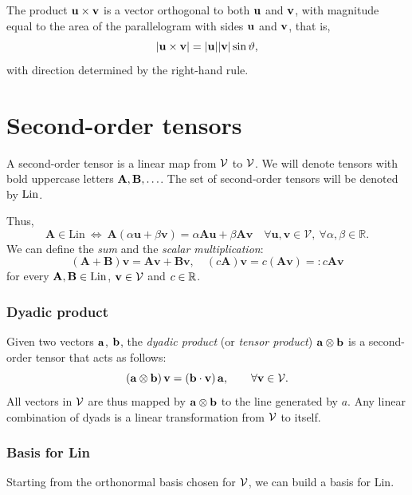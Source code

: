 The product $\mathbf{u}\times \mathbf{v}$ is a vector orthogonal to both $\mathbf{u}$ and $\mathbf{v}$, with magnitude equal to the area of the parallelogram with sides $\mathbf{u}$ and $\mathbf{v}$, that is,
\begin{equation}
	|\mathbf{u} \times \mathbf{v}|=|\mathbf{u}||\mathbf{v}|\sin\vartheta,
\end{equation}
with direction determined by the right-hand rule.


\section{Second-order tensors}
A second-order tensor is a linear map from $\mathcal{V}$ to $\mathcal{V}$. We will denote tensors with bold uppercase letters $\mathbf{A}, \mathbf{B}, \ldots$. The set of second-order tensors will be denoted by $\operatorname{Lin}$.

Thus,
\begin{equation}
	\mathbf{A}\in\mathrm{Lin~}\Longleftrightarrow\mathbf{~A}(\alpha\mathbf{u}+\beta\mathbf{v})=\alpha\mathbf{A}\mathbf{u}+\beta\mathbf{A}\mathbf{v}\quad\forall\mathbf{u},\mathbf{v}\in\mathcal{V},\mathrm{~}\forall \alpha, \beta\in\mathbb{R}.
\end{equation}
We can define the \textit{sum} and the \textit{scalar multiplication}:
\begin{equation}
	(\mathbf{A}+\mathbf{B})\mathbf{v}=\mathbf{A}\mathbf{v}+\mathbf{B}\mathbf{v},\quad(c\mathbf{A})\mathbf{v}=c(\mathbf{A}\mathbf{v})=:c\mathbf{A}\mathbf{v}
\end{equation}
for every $\mathbf{A}, \mathbf{B} \in \operatorname{Lin}$, $\mathbf{v} \in \mathcal{V}$ and $c\in \mathbb{R}$.

\subsubsection{Dyadic product}
Given two vectors $\mathbf{a}$, $\mathbf{b}$, the \textit{dyadic product} (or \textit{tensor product}) $\mathbf{a} \otimes \mathbf{b}$ is a second-order tensor that acts as follows:
\begin{equation}
	(\mathbf{a} \otimes \mathbf{b})\,\mathbf{v} =(\mathbf{b} \cdot \mathbf{v})\,\mathbf{a}, \qquad \forall \mathbf{v} \in \mathcal{V}.
\end{equation}
All vectors in $\mathcal{V}$ are thus mapped by $\mathbf{a} \otimes \mathbf{b}$ to the line generated by $a$.
Any linear combination of dyads is a linear transformation from $\mathcal{V}$ to itself.

\subsubsection{Basis for Lin}
Starting from the orthonormal basis chosen for $\mathcal{V}$, we can build a basis for Lin.

